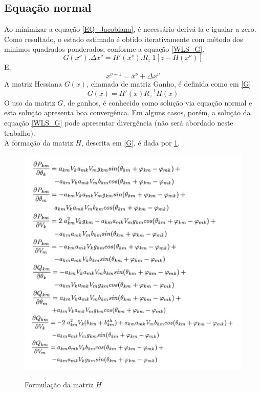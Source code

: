 \subsection{Equação normal}
\label{SectionFormula}
Ao minimizar a equação \ref{EQ_Jacobiana}, é necessário derivá-la e igualar a zero. Como resultado, o estado estimado é obtido iterativamente com método dos minimos quadrados ponderados, conforme a equação \ref{WLS_G}.
\begin{equation}
    G(x^\nu). \Delta x^\nu = H'(x^\nu).R_z^-1 [z-H(x^\nu)]
    \label{WLS_G}
\end{equation}
E,
\begin{equation}
    x^{\nu+1} = x^\nu + \Delta x^\nu
\end{equation}
A matriz Hessiana $G(x)$, chamada de matriz Ganho, é definida como em \ref{G}
\begin{equation}
    G(x) = H'(x)R_z^{-1}H(x)
    \label{G}
\end{equation}
O uso da matriz $G$, de ganhos, é conhecido como solução via equação normal e esta solução apresenta boa convergênca. Em alguns casos, porém, a solução da equação \ref{WLS_G} pode apresentar divergência (não será abordado neste trabalho).\\
A formação da matriz $H$, descrita em \ref{G}, é dada por \ref{H}.
\begin{figure}[!htb]
\caption{Formulação da matriz $H$}
 \centering %
\includegraphics[width=12cm]{figuras/H.JPG}
\label{H}
\end{figure}
